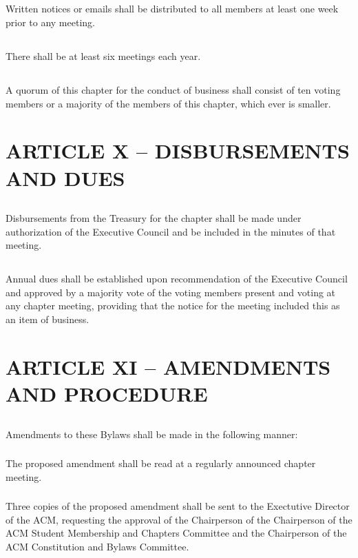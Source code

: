 \documentclass[12pt]{article}
\begin{document}
\subsection{}	Written notices or emails shall be distributed to all members at least one week prior to any meeting.
\subsection{}	There shall be at least six meetings each year.
\subsection{}	A quorum of this chapter for the conduct of business shall consist of ten voting members or a majority of the members of this chapter, which ever is smaller.

\section{ARTICLE X – DISBURSEMENTS AND DUES}
\subsection{}	Disbursements from the Treasury for the chapter shall be made under authorization of the Executive Council and be included in the minutes of that meeting.
\subsection{}	Annual dues shall be established upon recommendation of the Executive Council and approved by a majority vote of the voting members present and voting at any chapter meeting, providing that the notice for the meeting included this as an item of business.

\section{ARTICLE XI – AMENDMENTS AND PROCEDURE}
\subsection{}	Amendments to these Bylaws shall be made in the following manner:
\subsubsection{}	The proposed amendment shall be read at a regularly announced chapter meeting.
\subsubsection{}	Three copies of the proposed amendment shall be sent to the Exectutive Director of the ACM, requesting the approval of the Chairperson of the Chairperson of the ACM Student Membership and Chapters Committee and the Chairperson of the ACM Constitution and Bylaws Committee.
\end{document}
